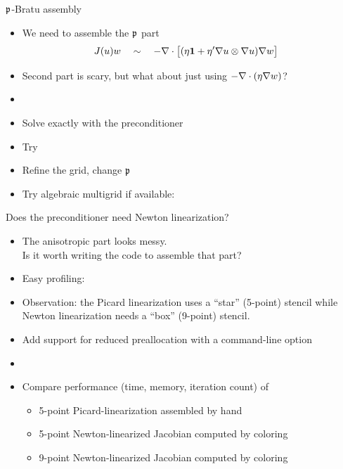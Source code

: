 \begin{frame}{${\mathfrak p}$-Bratu assembly}
  \begin{itemize}
  \item We need to assemble the ${\mathfrak p}$ part
    \begin{align*}
      J(u)w \quad &\sim\quad -\nabla \cdot \big[(\eta\bm 1 + \eta' \nabla u \otimes \nabla u) \nabla w\big]
    \end{align*}
  \item Second part is scary, but what about just using $-\nabla \cdot (\eta\nabla w)$?
  \item {}
  \item Solve exactly with the preconditioner 
  \item Try 
  \item Refine the grid, change ${\mathfrak p}$
  \item Try algebraic multigrid if available: 
  \end{itemize}
\end{frame}

\begin{frame}{Does the preconditioner need Newton linearization?}
  \begin{itemize}
  \item The anisotropic part looks messy.  \\
    \alert{Is it worth writing the code to assemble that part?}
  \item Easy profiling: 
  \item Observation: the Picard linearization uses a ``star'' (5-point)
    stencil while Newton linearization needs a ``box'' (9-point) stencil.
  \item Add support for reduced preallocation with a command-line option
  \item {}
  \item Compare performance (time, memory, iteration count) of
    \begin{itemize}
    \item 5-point Picard-linearization assembled by hand
    \item 5-point Newton-linearized Jacobian computed by coloring
    \item 9-point Newton-linearized Jacobian computed by coloring
    \end{itemize}
  \end{itemize}
\end{frame}

